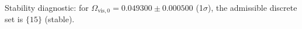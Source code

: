 Stability diagnostic: for $\Omega_{\mathrm{vis},0}=0.049300\pm 0.000500$ (1$\sigma$), the admissible discrete set is $\{15\}$ (stable).